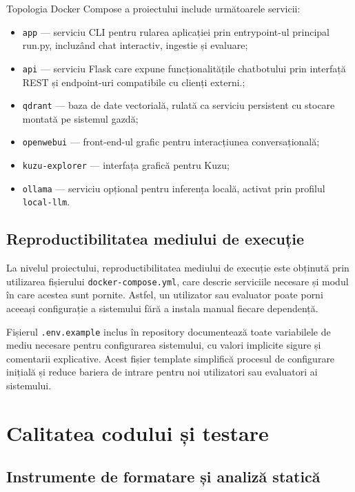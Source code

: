 \documentclass[12pt, a4paper, oneside, romanian]{teza-upb}
\begin{document}
Topologia Docker Compose a proiectului include următoarele servicii:
\begin{itemize}
  \item \texttt{app} — serviciu CLI pentru rularea aplicației prin entrypoint-ul principal run.py,
  incluzând chat interactiv, ingestie și evaluare;
  \item \texttt{api} — serviciu Flask care expune funcționalitățile chatbotului prin interfață REST
  și endpoint-uri compatibile cu clienți externi.;
  \item \texttt{qdrant} — baza de date vectorială, rulată ca serviciu 
  persistent cu stocare montată pe sistemul gazdă;
  \item \texttt{openwebui} — front-end-ul grafic pentru interacțiunea 
  conversațională;
  \item \texttt{kuzu-explorer} — interfața grafică pentru Kuzu;
  \item \texttt{ollama} — serviciu opțional pentru inferența locală, 
  activat prin profilul \texttt{local-llm}.
\end{itemize}

\subsection{Reproductibilitatea mediului de execuție}

La nivelul proiectului, reproductibilitatea mediului de execuție este obținută prin utilizarea fișierului \texttt{docker-compose.yml}, care descrie serviciile necesare și modul în care acestea sunt pornite. Astfel, un utilizator sau evaluator poate porni aceeași configurație a sistemului fără a instala manual fiecare dependență.

Fișierul \texttt{.env.example} inclus în repository documentează  toate variabilele de mediu necesare pentru configurarea sistemului, cu valori implicite sigure și comentarii explicative. Acest fișier template simplifică procesul de configurare inițială și reduce bariera de intrare pentru noi utilizatori sau evaluatori ai sistemului.

\section{Calitatea codului și testare}

\subsection{Instrumente de formatare și analiză statică}
\end{document}
